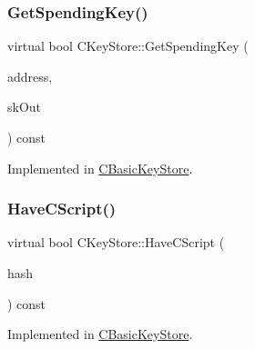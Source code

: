 \mbox{\label{class_c_key_store_a812534268d0324370c53ba3e7a295b95}} 
\subsubsection{\texorpdfstring{Get\+Spending\+Key()}{GetSpendingKey()}}
{\footnotesize\ttfamily virtual bool C\+Key\+Store\+::\+Get\+Spending\+Key (\begin{DoxyParamCaption}\item[{const libzcash\+::\+Payment\+Address \&}]{address,  }\item[{libzcash\+::\+Spending\+Key \&}]{sk\+Out }\end{DoxyParamCaption}) const\hspace{0.3cm}{\ttfamily [pure virtual]}}



Implemented in \mbox{\hyperlink{class_c_basic_key_store_a0c7997c0413eaa7ec76ec5bef0b40a2a}{C\+Basic\+Key\+Store}}.

\mbox{\label{class_c_key_store_a51c9fc86b2c3fece10d86146231fa58d}} 
\subsubsection{\texorpdfstring{Have\+C\+Script()}{HaveCScript()}}
{\footnotesize\ttfamily virtual bool C\+Key\+Store\+::\+Have\+C\+Script (\begin{DoxyParamCaption}\item[{const C\+Script\+ID \&}]{hash }\end{DoxyParamCaption}) const\hspace{0.3cm}{\ttfamily [pure virtual]}}



Implemented in \mbox{\hyperlink{class_c_basic_key_store_a499e0a1d117b43e3200883d88a400bf6}{C\+Basic\+Key\+Store}}.

\mbox{\label{class_c_key_store_a9398451d4270fae27b29f686a9d43a65}} 

